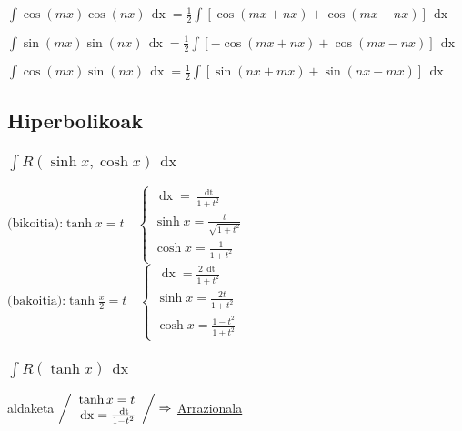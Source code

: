\documentclass[8pt]{article}
\DeclareMathOperator{\xder}{\, \mathrm{d}x}
\DeclareMathOperator{\tder}{\, \mathrm{d}t}
\begin{document}
		\subsubsection{}

			$ \int \cos (mx) \cos (nx) \xder = \frac{1}{2}
					\int [ \cos (mx + nx) + \cos (mx - nx) ] \xder $

			$ \int \sin (mx) \sin (nx) \xder = \frac{1}{2}
					\int [-\cos (mx + nx) + \cos (mx - nx) ] \xder $

			$ \int \cos (mx) \sin (nx) \xder = \frac{1}{2}
					\int [ \sin (nx + mx) + \sin (nx - mx) ] \xder $

	\subsection{Hiperbolikoak}
		\subsubsection{$ \int R(\sinh x, \cosh x) \xder $}
			$ \text{(bikoitia):} \tanh x = t \quad
				\left\{
				\begin{array}{c}
					\xder = \frac{\tder}{1+{t}^{2}}\\
					\sinh x = \frac{t}{\sqrt{1+{t}^{2}}}\\
					\cosh x = \frac{1}{1+{t}^{2}}
				\end{array}
				\right.
			$ \quad
			$ \text{(bakoitia):} \tanh \frac{x}{2} = t \quad
				\left\{
				\begin{array}{c}
					\xder = \frac{2\tder}{1+{t}^{2}}\\
					\sinh x = \frac{2t}{1+{t}^{2}}\\
					\cosh x = \frac{1-{t}^{2}}{1+{t}^{2}}
				\end{array}
				\right.
			$
		\subsubsection{$ \int R(\tanh x) \xder $}
			aldaketa
			$
			\left/
				\begin{array}{c}
					\tanh x = t\\
					\xder = \frac{\tder}{1-{t}^{2}}
				\end{array}
			\right/ \Rightarrow $ \underline{Arrazionala}
\end{document}

